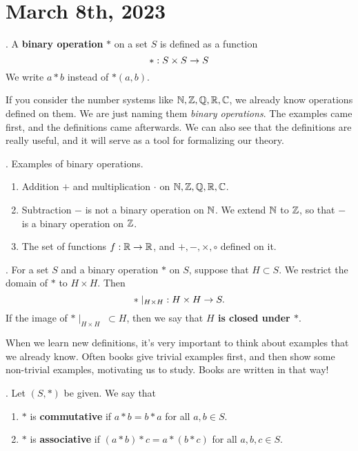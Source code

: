 
\section*{March 8th, 2023}

.  A \textbf{binary operation} \(*\) on a set \(S\) is defined as a function
\[
    *: S \times S \rightarrow S
\]
We write \(a * b\) instead of \(*(a, b)\).

\rmk If you consider the number systems like \(\mathbb{N}, \mathbb{Z}, \mathbb{Q}, \mathbb{R}, \mathbb{C}\), we already know operations defined on them. We are just naming them \textit{binary operations}. The examples came first, and the definitions came afterwards. We can also see that the definitions are really useful, and it will serve as a tool for formalizing our theory.

\ex. Examples of binary operations.
\begin{enumerate}
    \item Addition \(+\) and multiplication \(\cdot\) on \(\mathbb{N}, \mathbb{Z}, \mathbb{Q}, \mathbb{R}, \mathbb{C}\).
    \item Subtraction \(-\) is not a binary operation on \(\mathbb{N}\). We extend \(\mathbb{N}\) to \(\mathbb{Z}\), so that \(-\) is a binary operation on \(\mathbb{Z}\).
    \item The set of functions \(f: \mathbb{R} \rightarrow \mathbb{R}\), and \(+, -, \times, \circ\) defined on it.
\end{enumerate}

.  For a set \(S\) and a binary operation \(*\) on \(S\), suppose that \(H \subset S\). We restrict the domain of \(*\) to \(H \times H\). Then
\[
    *\mid_{H\times H} \;: H\times H \rightarrow S.
\]
If the image of \(*\mid_{H\times H} \;\subset H\), then we say that \textbf{\(H\) is closed under \(*\)}.

\rmk When we learn new definitions, it's very important to think about examples that we already know. Often books give trivial examples first, and then show some non-trivial examples, motivating us to study. Books are written in that way!

. Let \((S, *)\) be given. We say that
\begin{enumerate}
    \item \(*\) is \textbf{commutative} if \(a * b = b * a\) for all \(a, b \in S\).
    \item \(*\) is \textbf{associative} if \((a * b)* c = a * (b * c)\) for all \(a, b, c \in S\).
\end{enumerate}

